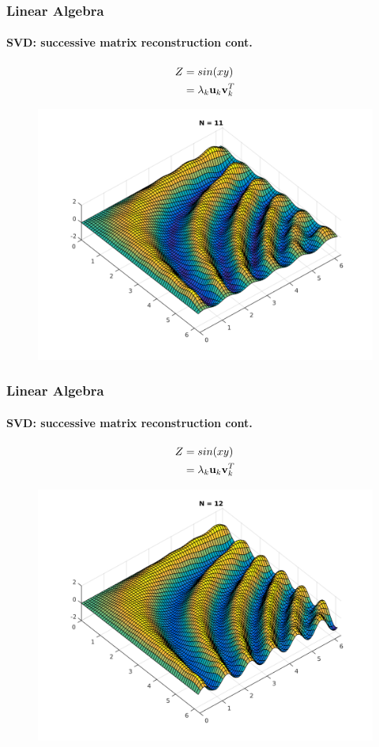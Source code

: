 \documentclass[hyperref={pdfpagelabels=true}]{beamer}
\begin{document}
\begin{frame}
\frametitle{Linear Algebra}
\framesubtitle{SVD: successive matrix reconstruction {\tiny cont.}} 
\small{
\begin{center}
\begin{align*}
Z &= sin(xy) \\
  &= \lambda_k{\bf u}_k {\bf v}_k^T
\end{align*}
\end{center}}
\begin{figure}[!htb]
\centering
\includegraphics [scale=0.415]{as/a11.png}
\end{figure}
\end{frame}


\begin{frame}
\frametitle{Linear Algebra}
\framesubtitle{SVD: successive matrix reconstruction {\tiny cont.}} 
\small{
\begin{center}
\begin{align*}
Z &= sin(xy) \\
  &= \lambda_k{\bf u}_k {\bf v}_k^T
\end{align*}
\end{center}}
\begin{figure}[!htb]
\centering
\includegraphics [scale=0.415]{as/a12.png}
\end{figure}
\end{frame}
\end{document}
